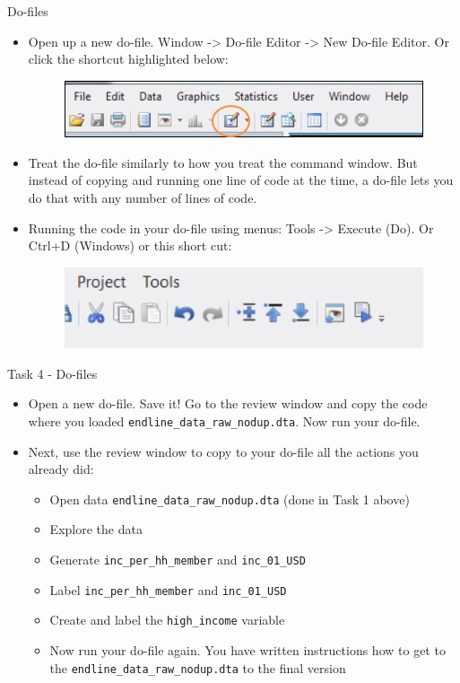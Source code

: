 \documentclass[aspectratio=169]{beamer}
\begin{document}
\begin{frame}{Do-files}
	\begin{itemize}
		\item Open up a new do-file. Window -> Do-file Editor -> New Do-file Editor. Or click the shortcut highlighted below:
		\begin{figure}
			\centering
			\includegraphics[width=.6\linewidth]{img/dofilewindow1}
		\end{figure}
		\item Treat the do-file similarly to how you treat the command window. But instead of copying and running one line of code at the time, a do-file lets you do that with any number of lines of code.
		\item Running the code in your do-file using menus: Tools -> Execute (Do). Or Ctrl+D (Windows) or this short cut:
		\begin{figure}
			\centering
			\includegraphics[width=.5\linewidth]{img/dofilewindow2}
		\end{figure}
	\end{itemize}
\end{frame}

\begin{frame}{Task 4 - Do-files}
	\begin{itemize}
		\item Open a new do-file. Save it! Go to the review window and copy the code where you loaded \texttt{endline\_data\_raw\_nodup.dta}. Now run your do-file.
		\item Next, use the review window to copy to your do-file all the actions you already did:
		\begin{itemize}
			\item Open data \texttt{endline\_data\_raw\_nodup.dta} (done in Task 1 above)
			\item Explore the data
			\item Generate \texttt{inc\_per\_hh\_member} and \texttt{inc\_01\_USD}
			\item Label \texttt{inc\_per\_hh\_member} and \texttt{inc\_01\_USD}
			\item Create and label the \texttt{high\_income} variable
			\item Now run your do-file again. You have written instructions how to get to the \texttt{endline\_data\_raw\_nodup.dta} to the final version
		\end{itemize}
	\end{itemize}
\end{frame}
\end{document}
